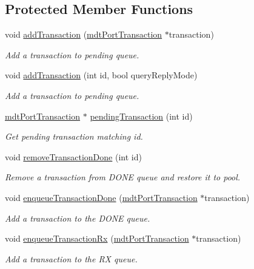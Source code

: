 \subsection*{Protected Member Functions}
\begin{DoxyCompactItemize}
\item 
void \hyperlink{classmdt_port_manager_ae5357262f1a0d6b95cc3fc7b975cdd38}{addTransaction} (\hyperlink{classmdt_port_transaction}{mdtPortTransaction} $\ast$transaction)
\begin{DoxyCompactList}\small\item\em Add a transaction to pending queue. \end{DoxyCompactList}\item 
void \hyperlink{classmdt_port_manager_a4b5300fbf05c2c267ca3a247ac3ab77f}{addTransaction} (int id, bool queryReplyMode)
\begin{DoxyCompactList}\small\item\em Add a transaction to pending queue. \end{DoxyCompactList}\item 
\hyperlink{classmdt_port_transaction}{mdtPortTransaction} $\ast$ \hyperlink{classmdt_port_manager_a117486e5720465e1295d337063d536c2}{pendingTransaction} (int id)
\begin{DoxyCompactList}\small\item\em Get pending transaction matching id. \end{DoxyCompactList}\item 
void \hyperlink{classmdt_port_manager_ada4b906ade973dfd45200dacbfe63f73}{removeTransactionDone} (int id)
\begin{DoxyCompactList}\small\item\em Remove a transaction from DONE queue and restore it to pool. \end{DoxyCompactList}\item 
void \hyperlink{classmdt_port_manager_ad024a2db17ae2e6459da0adad3d7c3c8}{enqueueTransactionDone} (\hyperlink{classmdt_port_transaction}{mdtPortTransaction} $\ast$transaction)
\begin{DoxyCompactList}\small\item\em Add a transaction to the DONE queue. \end{DoxyCompactList}\item 
void \hyperlink{classmdt_port_manager_ab30fc99951b2b6a566422c7525106ddf}{enqueueTransactionRx} (\hyperlink{classmdt_port_transaction}{mdtPortTransaction} $\ast$transaction)
\begin{DoxyCompactList}\small\item\em Add a transaction to the RX queue. \end{DoxyCompactList}\item 

\end{DoxyCompactItemize}
